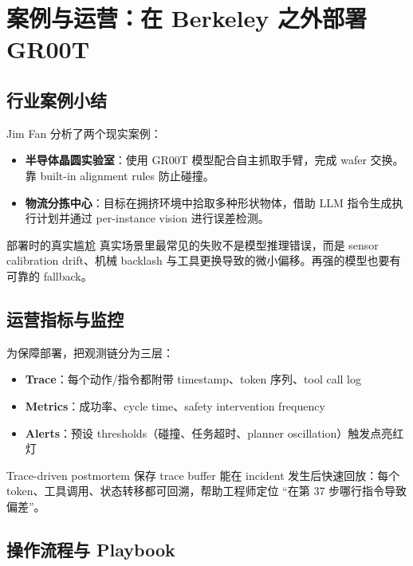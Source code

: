 \section{案例与运营：在 Berkeley 之外部署 GR00T}

\subsection{行业案例小结}

Jim Fan 分析了两个现实案例：

\begin{itemize}
    \item \textbf{半导体晶圆实验室}：使用 GR00T 模型配合自主抓取手臂，完成 wafer 交换。靠 built-in alignment rules 防止碰撞。
    \item \textbf{物流分拣中心}：目标在拥挤环境中拾取多种形状物体，借助 LLM 指令生成执行计划并通过 per-instance vision 进行误差检测。
\end{itemize}

\begin{warningbox}{部署时的真实尴尬}
真实场景里最常见的失败不是模型推理错误，而是 sensor calibration drift、机械 backlash 与工具更换导致的微小偏移。再强的模型也要有可靠的 fallback。
\end{warningbox}

\subsection{运营指标与监控}

为保障部署，把观测链分为三层：

\begin{itemize}
    \item \textbf{Trace}：每个动作/指令都附带 timestamp、token 序列、tool call log
    \item \textbf{Metrics}：成功率、cycle time、safety intervention frequency
    \item \textbf{Alerts}：预设 thresholds（碰撞、任务超时、planner oscillation）触发点亮红灯
\end{itemize}

\begin{knowledgebox}{Trace-driven postmortem}
保存 trace buffer 能在 incident 发生后快速回放：每个 token、工具调用、状态转移都可回溯，帮助工程师定位 ``在第 37 步哪行指令导致偏差''。
\end{knowledgebox}

\subsection{操作流程与 Playbook}

